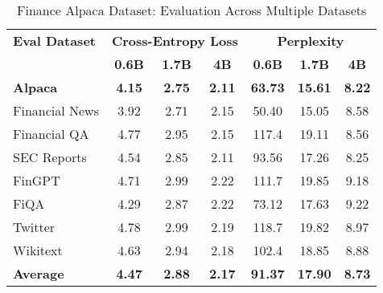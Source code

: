 
\begin{table}[h]
\centering
\caption[Finance Alpaca: Evaluation Results]{Finance Alpaca Dataset: Evaluation Across Multiple Datasets}
\label{tab:alpaca_results}
\begin{tabular}{l|ccc|ccc}
\hline
\textbf{Eval Dataset} & \multicolumn{3}{c|}{\textbf{Cross-Entropy Loss}} & \multicolumn{3}{c}{\textbf{Perplexity}} \\
\cline{2-4} \cline{5-7}
  & \textbf{0.6B} & \textbf{1.7B} & \textbf{4B} & \textbf{0.6B} & \textbf{1.7B} & \textbf{4B} \\
\textbf{Alpaca} & \textbf{4.15} & \textbf{2.75} & \textbf{2.11} & \textbf{63.73} & \textbf{15.61} & \textbf{8.22} \\
Financial News & 3.92 & 2.71 & 2.15 & 50.40 & 15.05 & 8.58 \\
Financial QA & 4.77 & 2.95 & 2.15 & 117.4 & 19.11 & 8.56 \\
SEC Reports & 4.54 & 2.85 & 2.11 & 93.56 & 17.26 & 8.25 \\
FinGPT & 4.71 & 2.99 & 2.22 & 111.7 & 19.85 & 9.18 \\
FiQA & 4.29 & 2.87 & 2.22 & 73.12 & 17.63 & 9.22 \\
Twitter & 4.78 & 2.99 & 2.19 & 118.7 & 19.82 & 8.97 \\
Wikitext & 4.63 & 2.94 & 2.18 & 102.4 & 18.85 & 8.88 \\
\hline
\textbf{Average} & \textbf{4.47} & \textbf{2.88} & \textbf{2.17} & \textbf{91.37} & \textbf{17.90} & \textbf{8.73} \\
\hline
\end{tabular}
\end{table}
